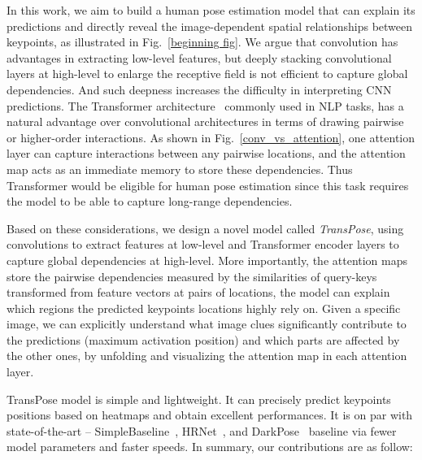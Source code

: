 \documentclass{article}
\begin{document}
In this work, we aim to build a human pose estimation model that can explain its predictions and directly reveal the image-dependent spatial relationships between keypoints, as illustrated in Fig.~\ref{beginning fig}. We argue that convolution has advantages in extracting low-level features, but deeply stacking convolutional layers at high-level to enlarge the receptive field is not efficient to capture global dependencies. And such deepness increases the difficulty in interpreting CNN predictions. The Transformer architecture~\cite{vaswani2017attention} commonly used in NLP tasks, has a natural advantage over convolutional architectures in terms of drawing pairwise or higher-order interactions. As shown in Fig.~\ref{conv_vs_attention}, one attention layer can capture interactions between any pairwise locations, and the attention map acts as an immediate memory to store these dependencies. Thus Transformer would be eligible for human pose estimation since this task requires the model to be able to capture long-range dependencies. 
                  
Based on these considerations, we design a novel model called \emph{TransPose}, using convolutions to extract features at low-level and Transformer encoder layers to capture global dependencies at high-level. More importantly, the attention maps store the pairwise dependencies measured by the similarities of query-keys transformed from feature vectors at pairs of locations, the model can explain which regions the predicted keypoints locations highly rely on. Given a specific image, we can explicitly understand what image clues significantly contribute to the predictions (maximum activation position) and which parts are affected by the other ones, by unfolding and visualizing the attention map in each attention layer. 

TransPose model is simple and lightweight. It can precisely predict keypoints positions based on heatmaps and obtain excellent performances. It is on par with state-of-the-art -- SimpleBaseline~\cite{xiao2018simple}, HRNet~\cite{sun2019hrnet}, and DarkPose~\cite{zhang2020distribution} baseline via fewer model parameters and faster speeds. In summary, our contributions are as follow: 
\end{document}
